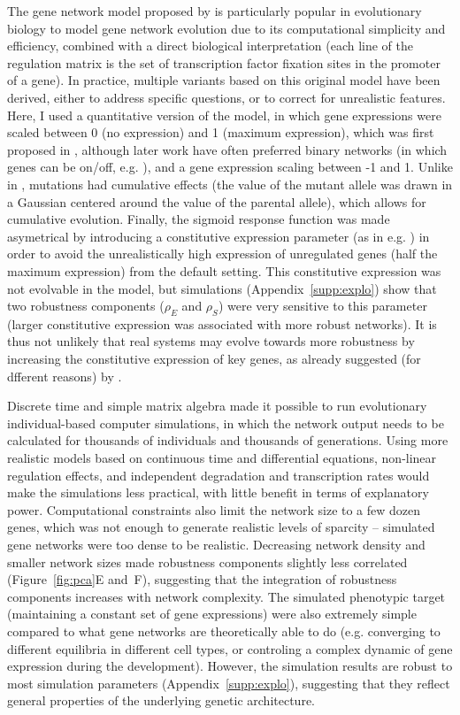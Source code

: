 \documentclass[10pt,a4paper]{article}
\newcommand{\stability}{{\rho_S}}
\newcommand{\earlyenv}{{\rho_E}}
\newcommand{\SupMat}{Appendix~}
\begin{document}
The gene network model proposed by \citet{Wag94} is particularly popular in evolutionary biology to model gene network evolution due to its computational simplicity and efficiency, combined with a direct biological interpretation (each line of the regulation matrix is the set of transcription factor fixation sites in the promoter of a gene). In practice, multiple variants based on this original model have been derived, either to address specific questions, or to correct for unrealistic features. Here, I used a quantitative version of the model, in which gene expressions were scaled between 0 (no expression) and 1 (maximum expression), which was first proposed in \citet{Wag94}, although later work have often preferred binary networks (in which genes can be on/off, e.g. \citealp{Wag96,CMW07}), and a gene expression scaling between -1 and 1. Unlike in \citet{Wag96, SB02}, mutations had cumulative effects (the value of the mutant allele was drawn in a Gaussian centered around the value of the parental allele), which allows for cumulative evolution. Finally, the sigmoid response function was made asymetrical by introducing a constitutive expression parameter (as in e.g. \citealp{RL16}) in order to avoid the unrealistically high expression of unregulated genes (half the maximum expression) from the default setting. This constitutive expression was not evolvable in the model, but simulations (\SupMat \ref{supp:explo}) show that two robustness components ($\earlyenv$ and $\stability$) were very sensitive to this parameter (larger constitutive expression was associated with more robust networks). It is thus not unlikely that real systems may evolve towards more robustness by increasing the constitutive expression of key genes, as already suggested (for dfferent reasons) by \citet{DW15}. 

Discrete time and simple matrix algebra made it possible to run evolutionary individual-based computer simulations, in which the network output needs to be calculated for thousands of individuals and thousands of generations. Using more realistic models based on continuous time and differential equations, non-linear regulation effects, and independent degradation and transcription rates would make the simulations less practical, with little benefit in terms of explanatory power. Computational constraints also limit the network size to a few dozen genes, which was not enough to generate realistic levels of sparcity -- simulated gene networks were too dense to be realistic. Decreasing network density and smaller network sizes made robustness components slightly less correlated (Figure~\ref{fig:pca}E and~F), suggesting that the integration of robustness components increases with network complexity. The simulated phenotypic target (maintaining a constant set of gene expressions) were also extremely simple compared to what gene networks are theoretically able to do (e.g. converging to different equilibria in different cell types, or controling a complex dynamic of gene expression during the development). However, the simulation results are robust to most simulation parameters (\SupMat \ref{supp:explo}), suggesting that they reflect general properties of the underlying genetic architecture. 
\end{document}
